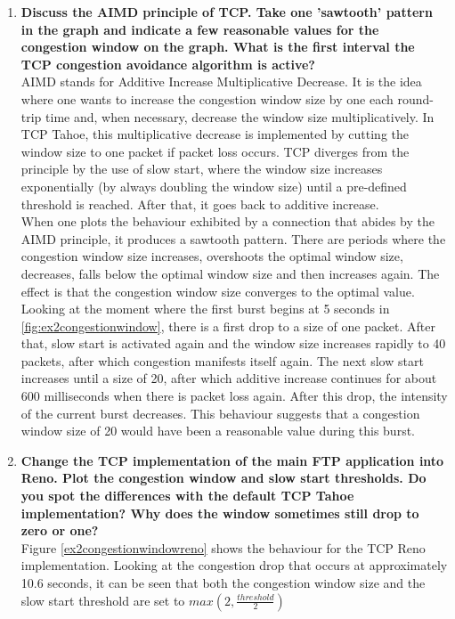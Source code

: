 \begin{enumerate}
 \item \textbf{Discuss the AIMD principle of TCP. Take one 'sawtooth' pattern in the graph and indicate a few
 reasonable values for the congestion window on the graph. What is the first interval the TCP congestion avoidance
 algorithm is active?} \\
 
 AIMD stands for Additive Increase Multiplicative Decrease. It is the idea where one wants to increase the congestion window
 size by one each round-trip time and, when necessary, decrease the window size multiplicatively. In TCP Tahoe, this
 multiplicative decrease is implemented by cutting the window size to one packet if packet loss occurs. TCP diverges
 from the principle by the use of slow start, where the window size increases exponentially (by always doubling the
 window size) until a pre-defined threshold is reached. After that, it goes back to additive increase. \\
 
 When one plots the behaviour exhibited by a connection that abides by the AIMD principle, it produces a sawtooth pattern.
 There are periods where the congestion window size increases, overshoots the optimal window size, decreases, falls
 below the optimal window size and then increases again. The effect is that the congestion window size converges
 to the optimal value. Looking at the moment where the first burst begins at 5 seconds in \ref{fig:ex2congestionwindow},
 there is a first drop to a size of one packet. After that, slow start is activated again and the window size increases
 rapidly to 40 packets, after which congestion manifests itself again. The next slow start increases until a size of 20,
 after which additive increase continues for about 600 milliseconds when there is packet loss again. After this drop,
 the intensity of the current burst decreases. This behaviour suggests that a congestion window size of 20 would have been
 a reasonable value during this burst.
 
 \item \textbf{Change the TCP implementation of the main FTP application into Reno. Plot the congestion window
 and slow start thresholds. Do you spot the differences with the default TCP Tahoe implementation? Why does the
 window sometimes still drop to zero or one?} \\
 
 Figure \ref{ex2congestionwindowreno} shows the behaviour for the TCP Reno implementation. Looking at the congestion drop
 that occurs at approximately 10.6 seconds, it can be seen that both the congestion window size and the slow start threshold
 are set to $max(2, \frac{threshold}{2})$
 

\end{enumerate}
